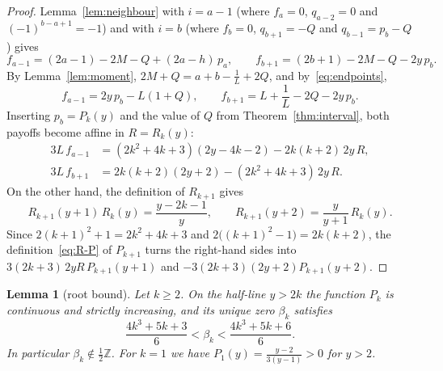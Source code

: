 \documentclass[11pt]{article}
\newtheorem{lemma}[theorem]{Lemma}
\theoremstyle{definition}
\theoremstyle{remark}
\begin{document}
\begin{proof}
Lemma~\ref{lem:neighbour} with $i=a-1$ (where $f_a=0$, $q_{a-2}=0$ and
$(-1)^{b-a+1}=-1$) and with $i=b$ (where $f_b=0$, $q_{b+1}=-Q$ and
$q_{b-1}=p_b-Q$) gives
\[
f_{a-1}=(2a-1)-2M-Q+(2a-h)\,p_a,\qquad
f_{b+1}=(2b+1)-2M-Q-2y\,p_b.
\]
By Lemma~\ref{lem:moment}, $2M+Q=a+b-\frac1L+2Q$, and
by~\eqref{eq:endpoints},
\[
f_{a-1}=2y\,p_b-L(1+Q),\qquad
f_{b+1}=L+\frac1L-2Q-2y\,p_b .
\]
Inserting $p_b=P_k(y)$ and the value of $Q$ from
Theorem~\ref{thm:interval}, both payoffs become affine in $R=R_k(y)$:
\begin{align*}
3L\,f_{a-1}&=(2k^2+4k+3)(2y-4k-2)-2k(k+2)\,2y\,R,\\
3L\,f_{b+1}&=2k(k+2)(2y+2)-(2k^2+4k+3)\,2y\,R.
\end{align*}
On the other hand, the definition of $R_{k+1}$ gives
\[
R_{k+1}(y+1)\,R_k(y)=\frac{y-2k-1}{y},\qquad
R_{k+1}(y+2)=\frac{y}{y+1}\,R_k(y).
\]
Since $2(k+1)^2+1=2k^2+4k+3$ and $2\bigl((k+1)^2-1\bigr)=2k(k+2)$, the
definition~\eqref{eq:R-P} of $P_{k+1}$ turns the right-hand sides into
$3(2k+3)\,2yR\,P_{k+1}(y+1)$ and $-3(2k+3)(2y+2)P_{k+1}(y+2)$.
\end{proof}

\begin{lemma}[root bound]\label{lem:root}
Let $k\ge2$. On the half-line $y>2k$ the function $P_k$ is continuous
and strictly increasing, and its unique zero $\beta_k$ satisfies
\[
\frac{4k^3+5k+3}{6}<\beta_k<\frac{4k^3+5k+6}{6}.
\]
In particular $\beta_k\notin\frac12\mathbb Z$. For $k=1$ we have
$P_1(y)=\frac{y-2}{3(y-1)}>0$ for $y>2$.
\end{lemma}
\end{document}
